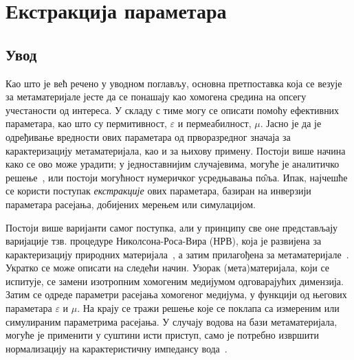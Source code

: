 \documentclass[main.tex]{subfiles}
\begin{document}





\newcommand{\sirina}{\columnwidth}
\newcommand{\sirinab}{\columnwidth}
\newcommand{\sirinac}{0.48\columnwidth}
\newcommand{\SkalaA}{0.3}
\newcommand{\SkalaB}{0.3}
\newcommand{\SkalaC}{0.3}
\newcommand{\subscript}[1]{\ensuremath{_{\textrm{#1}}}}




\newcommand{\ga}{\Gamma\Pi}

\chapter{Екстракција параметара}

\section{Увод}

Као што је већ речено у уводном поглављу, основна претпоставка која се везује за метаматеријале јесте да се понашају као хомогена средина на опсегу учестаности од интереса. У складу с тиме могу се описати помоћу ефективних параметара, као што су пермитивност, $\varepsilon$ и пермеабилност, $\mu$. Јасно је да је одређивање вредности ових параметара од прворазредног значаја за карактеризацију метаматеријала, као и за њихову примену. Постоји више начина како се ово може урадити; у једноставнијим случајевима, могуће је аналитичко решење~\cite{pendri:99}, или постоји могућност нумеричког усредњавања п\^{о}ља. Ипак, најчешће се користи поступак \emph{екстракције} ових параметара, базиран на инверзији параметара расејања, добијених мерењем или симулацијом.

Постоји више варијанти самог поступка, али у принципу све оне представљају варијације тзв. процедуре Николсона-Роса-Вира (НРВ), која је развијена за карактеризацију природних материјала~\cite{Nicol:70,Weir:74}, а затим прилагођена за метаматеријале~\cite{Smith:02,Markos:03}. Укратко се може описати на следећи начин. Узорак (мета)материјала, који се испитује, се замени изотропним хомогеним медијумом одговарајућих димензија. Затим се одреде параметри расејања хомогеног медијума, у функцији од његових параметара $\varepsilon$ и $\mu$. На крају се тражи решење које се поклапа са измереним или симулираним параметрима расејања. У случају водова на бази метаматеријала, могуће је применити у суштини исти приступ, само је потребно извршити нормализацију на карактеристичну импедансу вода~\cite{Mao:05}.
\end{document}
